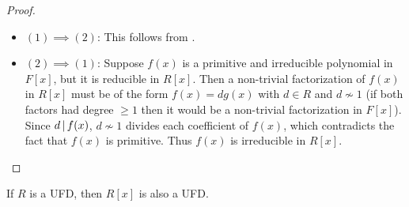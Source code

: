 \documentclass[11pt]{article}
\begin{document}
\begin{proof}\,
    \begin{itemize}
        \item$(1)\implies(2)$: This follows from .

        \item$(2)\implies(1)$: Suppose $f(x)$ is a primitive and irreducible polynomial in $F[x]$, but it is reducible in $R[x]$. Then a non-trivial factorization of $f(x)$ in $R[x]$ must be of the form $f(x)=dg(x)$ with $d\in R$ and $d\not\sim 1$ (if both factors had degree $\geq1$ then it would be a non-trivial factorization in $F[x]$). Since $d\,|\, f(x)$, $d\not\sim 1$ divides each coefficient of $f(x)$, which contradicts the fact that $f(x)$ is primitive. Thus $f(x)$ is irreducible in $R[x]$.
    \end{itemize}
\end{proof}

\begin{theorem}
    If $R$ is a UFD, then $R[x]$ is also a UFD.
\end{theorem}
\end{document}
